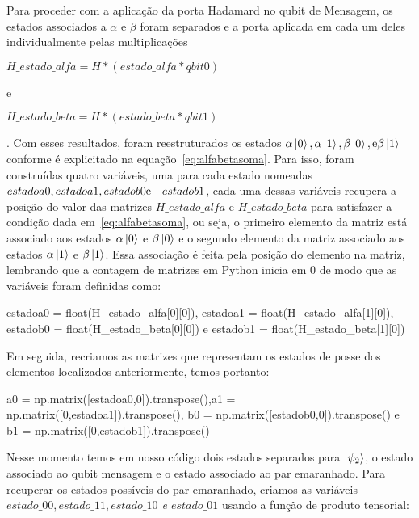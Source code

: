 Para proceder com a aplicação da porta Hadamard no qubit de Mensagem, os estados associados a $\alpha$ e $\beta$ foram separados e a porta aplicada em cada um deles individualmente pelas multiplicações \begin{tiny}\textbf{$H\_estado\_alfa = H * (estado\_alfa * qbit0)$}\end{tiny} e \begin{tiny}\textbf{$H\_estado\_beta = H * (estado\_beta * qbit1)$}\end{tiny}. Com esses resultados, foram reestruturados os estados $\alpha\ket{0}, \alpha\ket{1}, \beta\ket{0}, \text e \beta\ket{1}$ conforme é explicitado na equação~\eqref{eq:alfabetasoma}. Para isso, foram construídas quatro variáveis, uma para cada estado nomeadas \textit{$estadoa0, estadoa1, estadob0 \text e \quad estadob1$}, cada uma dessas variáveis recupera a posição do valor das matrizes \textit{$H\_estado\_alfa$} e \textit{$H\_estado\_beta$} para satisfazer a condição dada em~\eqref{eq:alfabetasoma}, ou seja, o primeiro elemento da matriz está associado aos estados $\alpha\ket{0}$ e $\beta\ket{0}$ e o segundo elemento da matriz associado aos estados $\alpha\ket{1}$ e $\beta\ket{1}$. Essa associação é feita pela posição do elemento na matriz, lembrando que a contagem de matrizes em Python inicia em 0 de modo que as variáveis foram definidas como:

\begin{center}
\begin{tiny}estadoa0 = float(H\_estado\_alfa[0][0]), estadoa1 = float(H\_estado\_alfa[1][0]),\linebreak
estadob0 = float(H\_estado\_beta[0][0]) e  estadob1 = float(H\_estado\_beta[1][0])\end{tiny}
\end{center}

Em seguida, recriamos as matrizes que representam os estados de posse dos elementos localizados anteriormente, temos portanto:

\begin{center}
\begin{tiny}a0 = np.matrix([estadoa0,0]).transpose(),a1 = np.matrix([0,estadoa1]).transpose(),\linebreak
b0 = np.matrix([estadob0,0]).transpose() e b1 = np.matrix([0,estadob1]).transpose()\end{tiny}
\end{center}

Nesse momento temos em nosso código dois estados separados para $\ket{\psi_2}$, o estado associado ao qubit mensagem e o estado associado ao par emaranhado. Para recuperar os estados possíveis do par emaranhado, criamos as variáveis \textit{$estado\_00, estado\_11, estado\_10$ e $estado\_01$} usando a função de produto tensorial:


